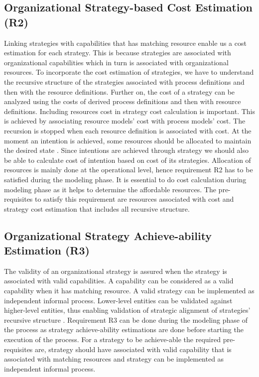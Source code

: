 \subsection{Organizational Strategy-based Cost Estimation (R2)}
Linking strategies with capabilities that has matching resource enable us a cost estimation for each strategy. This is because strategies are associated with organizational capabilities which in turn is associated with organizational resources. To incorporate the cost estimation of strategies, we have to understand the recursive structure of the strategies associated with process definitions and then with the resource definitions. Further on, the cost of a strategy can be analyzed using the costs of derived process definitions and then with resource definitions. Including resources cost in strategy cost calculation is important. This is achieved by associating resource models' cost with process models' cost. The recursion is stopped when each resource definition is associated with cost. At the moment an intention is achieved, some resources should be allocated to maintain the desired state \cite{Mandic2010}. Since intentions are achieved through strategy we should also be able to calculate cost of intention based on cost of its strategies. Allocation of resources is mainly done at the operational level, hence requirement R2 has to be satisfied during the modeling phase. It is essential to do cost calculation during modeling phase as it helps to determine the affordable resources. The pre-requisites to satisfy this requirement are resources associated with cost and strategy cost estimation that includes all recursive structure.

\subsection{Organizational Strategy Achieve-ability Estimation (R3)}
 The validity of an organizational strategy is assured when the strategy is associated with valid capabilities. A capability can be considered as a valid capability when it has matching resource. A valid strategy can be implemented as independent informal process. Lower-level entities can be validated against higher-level entities, thus enabling validation of strategic alignment of strategies' recursive structure \cite{Bleistein2006}. Requirement R3  can be done during the modeling phase of the process as strategy achieve-ability estimations are done before starting the execution of the process. For a strategy to be achieve-able the required pre-requisites are, strategy should have associated with valid capability that is associated with matching resources and strategy can be implemented as independent informal process.
 

